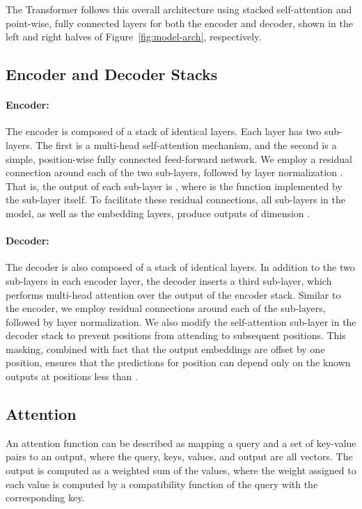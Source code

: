 \documentclass{article}
\begin{document}
The Transformer follows this overall architecture using stacked self-attention and point-wise, fully connected layers for both the encoder and decoder, shown in the left and right halves of Figure~\ref{fig:model-arch}, respectively.

\subsection{Encoder and Decoder Stacks}

\paragraph{Encoder:}The encoder is composed of a stack of  identical layers. Each layer has two sub-layers. The first is a multi-head self-attention mechanism, and the second is a simple, position-wise fully connected feed-forward network.   We employ a residual connection \citep{he2016deep} around each of the two sub-layers, followed by layer normalization \cite{layernorm2016}.  That is, the output of each sub-layer is , where  is the function implemented by the sub-layer itself.  To facilitate these residual connections, all sub-layers in the model, as well as the embedding layers, produce outputs of dimension .

\paragraph{Decoder:}The decoder is also composed of a stack of  identical layers.  In addition to the two sub-layers in each encoder layer, the decoder inserts a third sub-layer, which performs multi-head attention over the output of the encoder stack.  Similar to the encoder, we employ residual connections around each of the sub-layers, followed by layer normalization.  We also modify the self-attention sub-layer in the decoder stack to prevent positions from attending to subsequent positions.  This masking, combined with fact that the output embeddings are offset by one position, ensures that the predictions for position  can depend only on the known outputs at positions less than .



\subsection{Attention} \label{sec:attention}
An attention function can be described as mapping a query and a set of key-value pairs to an output, where the query, keys, values, and output are all vectors.  The output is computed as a weighted sum of the values, where the weight assigned to each value is computed by a compatibility function of the query with the corresponding key.
\end{document}
